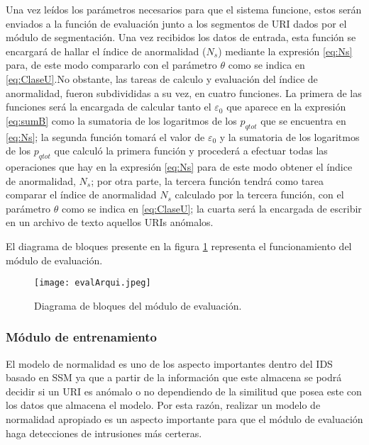 Una vez leídos los parámetros necesarios para que el sistema funcione, estos serán enviados a la función de evaluación junto a los segmentos de URI dados por el módulo de segmentación. Una vez recibidos los datos de entrada, esta función se encargará de hallar el índice de anormalidad ($N_{s}$) mediante la expresión \ref{eq:Ns} para, de este modo compararlo con el parámetro $\theta$ como se indica en \ref{eq:ClaseU}.No obstante, las tareas de calculo y evaluación del índice de anormalidad, fueron subdivididas a su vez, en cuatro funciones. La primera de las funciones será la encargada de calcular tanto el $\varepsilon_{0}$ que aparece en la expresión \ref{eq:sumB} como la sumatoria de los logaritmos de los $p_{qtot}$ que se encuentra en \ref{eq:Ns}; la segunda función tomará el valor de $\varepsilon_{0}$ y la sumatoria de los logaritmos de los $p_{qtot}$ que calculó la primera función y procederá a efectuar todas las operaciones que hay en la expresión \ref{eq:Ns} para de este modo obtener el índice de anormalidad, $N_{s}$; por otra parte, la tercera función tendrá como tarea comparar el índice de anormalidad $N_{s}$ calculado por la tercera función, con el parámetro $\theta$ como se indica en \ref{eq:ClaseU}; la cuarta será la encargada de escribir en un archivo de texto aquellos URIs anómalos.

El diagrama de bloques presente en la figura \ref{fig:arquiEvaluacion} representa el funcionamiento del módulo de evaluación.

\begin{figure}[tb]
\begin{center}
\texttt{[image: evalArqui.jpeg]}
\caption{Diagrama de bloques del módulo de evaluación.}
\label{fig:arquiEvaluacion}
\end{center}
\end{figure}

\subsubsection{Módulo de entrenamiento}\label{sec:entrenamiento}

El modelo de normalidad es uno de los aspecto importantes dentro del IDS basado en SSM ya que a partir de la información que este almacena se podrá decidir si un URI es anómalo o no dependiendo de la similitud que posea este con los datos que almacena el modelo. Por esta razón, realizar un modelo de normalidad apropiado es un aspecto  importante para que el módulo de evaluación haga detecciones de intrusiones más certeras.

